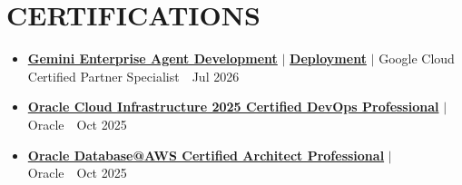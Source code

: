 \documentclass[a4paper,11pt]{article}
\newcommand{\resumeItem}[1]{
  \item\small{{#1 \vspace{-4pt}}}
}
\newcommand{\resumeItemListStart}{\begin{itemize}[label=\textbullet]}
\newcommand{\resumeItemListEnd}{\end{itemize}\vspace{-8pt}}
\begin{document}
\section{CERTIFICATIONS}
\resumeItemListStart
    \resumeItem{\href{https://www.credly.com/badges/1554037b-144f-473e-b9c0-1e46f70cd9c5/public_url}{\textbf{Gemini Enterprise Agent Development}} $|$ \href{https://www.credly.com/badges/ad27ae61-d25d-4233-9d33-b7a90a50fcb5/public_url}{\textbf{Deployment}} $|$ Google Cloud Certified Partner Specialist~\hfill~{\color{dark-grey}Jul 2026}}
    \resumeItem{\href{https://catalog-education.oracle.com/pls/certview/sharebadge?id=9C21FA710E65DA929318D24D303260ED715610F74E52386DEA00D7AFA53CA715}{\textbf{Oracle Cloud Infrastructure 2025 Certified DevOps Professional}} $|$ Oracle~\hfill~{\color{dark-grey}Oct 2025}}
    \resumeItem{\href{https://catalog-education.oracle.com/pls/certview/sharebadge?id=3B66449C498644E69668BCC51FD852528F48DBCCFD8B65D860D9E0FACFEECAB2}{\textbf{Oracle Database@AWS Certified Architect Professional}} $|$ Oracle~\hfill~{\color{dark-grey}Oct 2025}}
\resumeItemListEnd
\end{document}
